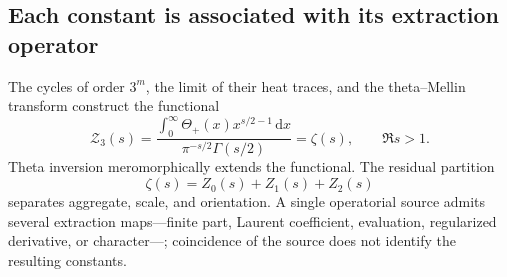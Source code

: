 \subsection{Each constant is associated with its extraction operator}

The cycles of order \(3^m\), the limit of their heat traces, and the
theta--Mellin transform construct the functional
\begin{equation}
 \mathcal Z_3(s)
 =\frac{\displaystyle
 \int_0^\infty\Theta_+(x)x^{s/2-1}\,\mathrm dx}
 {\pi^{-s/2}\Gamma(s/2)}
 =\zeta(s),
 \qquad \Re s>1.
 \label{p3-83-c44-s1:eq:funcional-triadico-resumen-rev11}
\end{equation}
Theta inversion meromorphically extends the functional. The residual
partition
\[
 \zeta(s)=Z_0(s)+Z_1(s)+Z_2(s)
\]
separates aggregate, scale, and orientation. A single operatorial source admits
several extraction maps---finite part, Laurent coefficient,
evaluation, regularized derivative, or character---; coincidence of the source
does not identify the resulting constants.

\par


